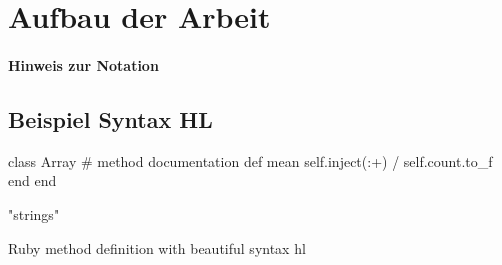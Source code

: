 \section{Aufbau der Arbeit}


\paragraph{Hinweis zur Notation}


\subsection{Beispiel Syntax HL}


\begin{listing}
\begin{rubycode}
class Array
  # method documentation
  def mean
    self.inject(:+) / self.count.to_f
  end
end

"strings"
\end{rubycode}
\label{lst:example}
\caption{Ruby method definition with beautiful syntax hl}
\end{listing}
